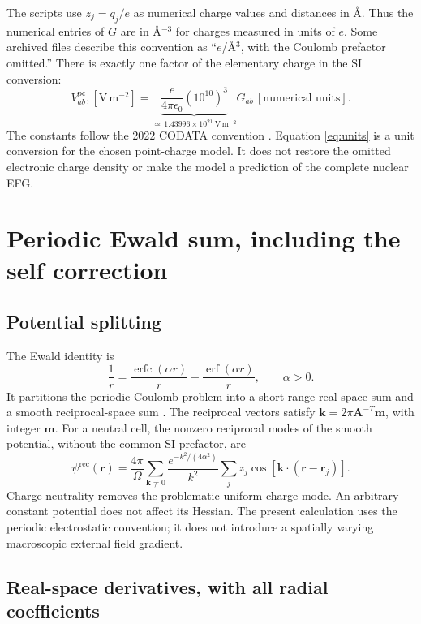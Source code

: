 \documentclass[11pt,a4paper]{article}
\newcommand{\erfc}{\operatorname{erfc}}
\newcommand{\erf}{\operatorname{erf}}
\newcommand{\rvec}{\bm r}
\newcommand{\kvec}{\bm k}
\begin{document}
The scripts use $z_j=q_j/e$ as numerical charge values and distances in
\AA. Thus the numerical entries of $G$ are in \AA$^{-3}$ for charges measured
in units of $e$. Some archived files describe this convention as
``$e$/\AA$^3$, with the Coulomb prefactor omitted.'' There is exactly one factor
of the elementary charge in the SI conversion:
\begin{equation}
 V^{\mathrm{pc}}_{ab},[\mathrm{V\,m^{-2}}]
 =\underbrace{\frac{e}{4\pi\epsilon_0}
 (10^{10})^3}_{\simeq\,1.43996\times10^{21}\ \mathrm{V\,m^{-2}}}
 G_{ab}\,[\text{numerical units}].
\label{eq:units}
\end{equation}
The constants follow the 2022 CODATA convention \cite{CODATA}. Equation
\eqref{eq:units} is a unit conversion for the chosen point-charge model. It does
not restore the omitted electronic charge density or make the model a prediction
of the complete nuclear EFG.

\section{Periodic Ewald sum, including the self correction}

\subsection{Potential splitting}

The Ewald identity is
\begin{equation}
 \frac1r=\frac{\erfc(\alpha r)}r+\frac{\erf(\alpha r)}r,
 \qquad \alpha>0.
\end{equation}
It partitions the periodic Coulomb problem into a short-range real-space sum
and a smooth reciprocal-space sum \cite{Ewald1921,DLPOLY}. The reciprocal vectors
satisfy $\kvec=2\pi\bm A^{-T}\bm m$, with integer $\bm m$. For a neutral cell,
the nonzero reciprocal modes of the smooth potential, without the common SI
prefactor, are
\begin{equation}
 \psi^{\mathrm{rec}}(\rvec)=\frac{4\pi}{\Omega}
 \sum_{\kvec\ne0}\frac{e^{-k^2/(4\alpha^2)}}{k^2}
 \sum_j z_j\cos[\kvec\cdot(\rvec-\rvec_j)].
\label{eq:recpotential}
\end{equation}
Charge neutrality removes the problematic uniform charge mode. An arbitrary
constant potential does not affect its Hessian. The present calculation uses
the periodic electrostatic convention; it does not introduce a spatially varying
macroscopic external field gradient.

\subsection{Real-space derivatives, with all radial coefficients}
\end{document}
